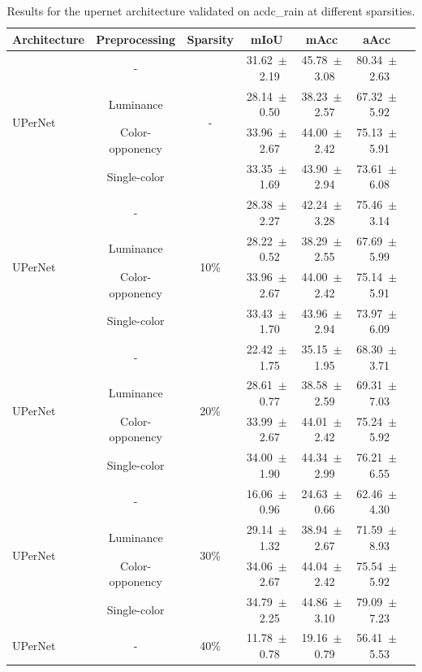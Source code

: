 \begin{table}[h]
\centering
\caption{Results for the upernet architecture validated on acdc_rain at different sparsities.}
\begin{tabular}{@{}lccc ccc@{}}
\toprule
Architecture & Preprocessing & Sparsity & mIoU & mAcc & aAcc \\
\midrule

\multirow{4}{*}{UPerNet} & - & \multirow{4}{*}{-} & 31.62~$\pm$~2.19 & 45.78~$\pm$~3.08 & 80.34~$\pm$~2.63 \\
& Luminance & & 28.14~$\pm$~0.50 & 38.23~$\pm$~2.57 & 67.32~$\pm$~5.92 \\
& Color-opponency & & 33.96~$\pm$~2.67 & 44.00~$\pm$~2.42 & 75.13~$\pm$~5.91 \\
& Single-color & & 33.35~$\pm$~1.69 & 43.90~$\pm$~2.94 & 73.61~$\pm$~6.08 \\
\midrule
\multirow{4}{*}{UPerNet} & - & \multirow{4}{*}{10\%} & 28.38~$\pm$~2.27 & 42.24~$\pm$~3.28 & 75.46~$\pm$~3.14 \\
& Luminance & & 28.22~$\pm$~0.52 & 38.29~$\pm$~2.55 & 67.69~$\pm$~5.99 \\
& Color-opponency & & 33.96~$\pm$~2.67 & 44.00~$\pm$~2.42 & 75.14~$\pm$~5.91 \\
& Single-color & & 33.43~$\pm$~1.70 & 43.96~$\pm$~2.94 & 73.97~$\pm$~6.09 \\
\midrule
\multirow{4}{*}{UPerNet} & - & \multirow{4}{*}{20\%} & 22.42~$\pm$~1.75 & 35.15~$\pm$~1.95 & 68.30~$\pm$~3.71 \\
& Luminance & & 28.61~$\pm$~0.77 & 38.58~$\pm$~2.59 & 69.31~$\pm$~7.03 \\
& Color-opponency & & 33.99~$\pm$~2.67 & 44.01~$\pm$~2.42 & 75.24~$\pm$~5.92 \\
& Single-color & & 34.00~$\pm$~1.90 & 44.34~$\pm$~2.99 & 76.21~$\pm$~6.55 \\
\midrule
\multirow{4}{*}{UPerNet} & - & \multirow{4}{*}{30\%} & 16.06~$\pm$~0.96 & 24.63~$\pm$~0.66 & 62.46~$\pm$~4.30 \\
& Luminance & & 29.14~$\pm$~1.32 & 38.94~$\pm$~2.67 & 71.59~$\pm$~8.93 \\
& Color-opponency & & 34.06~$\pm$~2.67 & 44.04~$\pm$~2.42 & 75.54~$\pm$~5.92 \\
& Single-color & & 34.79~$\pm$~2.25 & 44.86~$\pm$~3.10 & 79.09~$\pm$~7.23 \\
\midrule
\multirow{4}{*}{UPerNet} & - & \multirow{4}{*}{40\%} & 11.78~$\pm$~0.78 & 19.16~$\pm$~0.79 & 56.41~$\pm$~5.53 \\

\end{tabular}
\end{table}
